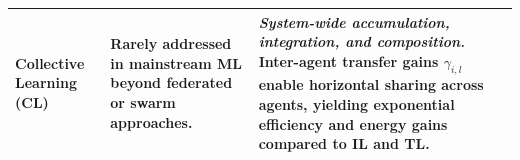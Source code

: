 \begin{table}[ht]
\begin{adjustbox}{width=\textwidth}
\begin{tabularx}{\textwidth}{lXX}
            \addlinespace
            \textbf{Collective Learning (CL)} &
            Rarely addressed in mainstream ML beyond federated or swarm approaches. &
            \textit{System-wide accumulation, integration, and composition.} Inter-agent transfer gains $\gamma_{i,l}$ enable horizontal sharing across agents, yielding exponential efficiency and energy gains compared to IL and TL. \\
            \bottomrule
        \end{tabularx}
    \end{adjustbox}
\end{table}



